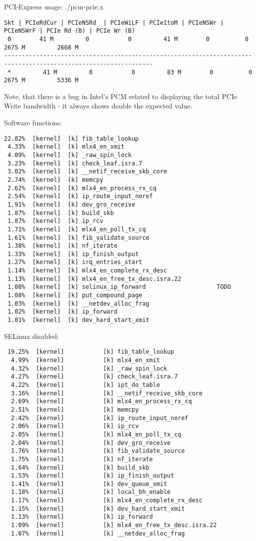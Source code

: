 PCI-Express usage: ./pcm-pcie.x
\begin{lstlisting}
Skt | PCIeRdCur | PCIeNSRd  | PCIeWiLF | PCIeItoM | PCIeNSWr | PCIeNSWrF | PCIe Rd (B) | PCIe Wr (B)
 0        41 M         0           0         41 M        0          0          2675 M         2668 M
----------------------------------------------------------------------------------------------------------------
 *         41 M         0           0         83 M        0          0          2675 M         5336 M
\end{lstlisting}
Note, that there is a bug in Intel's PCM related to displaying
the total PCIe Write bandwidth - it always shows double the expected value.


Software functions:
\begin{lstlisting}
22.02%  [kernel]  [k] fib_table_lookup
 4.33%  [kernel]  [k] mlx4_en_xmit
 4.09%  [kernel]  [k] _raw_spin_lock
 3.23%  [kernel]  [k] check_leaf.isra.7
 3.02%  [kernel]  [k] __netif_receive_skb_core
 2.74%  [kernel]  [k] memcpy
 2.62%  [kernel]  [k] mlx4_en_process_rx_cq
 2.54%  [kernel]  [k] ip_route_input_noref
 1.91%  [kernel]  [k] dev_gro_receive
 1.87%  [kernel]  [k] build_skb
 1.87%  [kernel]  [k] ip_rcv
 1.71%  [kernel]  [k] mlx4_en_poll_tx_cq
 1.61%  [kernel]  [k] fib_validate_source
 1.38%  [kernel]  [k] nf_iterate
 1.33%  [kernel]  [k] ip_finish_output
 1.27%  [kernel]  [k] irq_entries_start
 1.14%  [kernel]  [k] mlx4_en_complete_rx_desc
 1.13%  [kernel]  [k] mlx4_en_free_tx_desc.isra.22
 1.08%  [kernel]  [k] selinux_ip_forward                    TODO
 1.08%  [kernel]  [k] put_compound_page
 1.03%  [kernel]  [k] __netdev_alloc_frag
 1.02%  [kernel]  [k] ip_forward
 1.01%  [kernel]  [k] dev_hard_start_xmit
\end{lstlisting}



SELinux disabled:
\begin{lstlisting}
 19.25%  [kernel]           [k] fib_table_lookup
  4.99%  [kernel]           [k] mlx4_en_xmit
  4.32%  [kernel]           [k] _raw_spin_lock
  4.27%  [kernel]           [k] check_leaf.isra.7
  4.22%  [kernel]           [k] ipt_do_table
  3.16%  [kernel]           [k] __netif_receive_skb_core
  2.69%  [kernel]           [k] mlx4_en_process_rx_cq
  2.51%  [kernel]           [k] memcpy
  2.42%  [kernel]           [k] ip_route_input_noref
  2.06%  [kernel]           [k] ip_rcv
  2.05%  [kernel]           [k] mlx4_en_poll_tx_cq
  2.04%  [kernel]           [k] dev_gro_receive
  1.76%  [kernel]           [k] fib_validate_source
  1.75%  [kernel]           [k] nf_iterate
  1.64%  [kernel]           [k] build_skb
  1.53%  [kernel]           [k] ip_finish_output
  1.41%  [kernel]           [k] dev_queue_xmit
  1.18%  [kernel]           [k] local_bh_enable
  1.17%  [kernel]           [k] mlx4_en_complete_rx_desc
  1.15%  [kernel]           [k] dev_hard_start_xmit
  1.13%  [kernel]           [k] ip_forward
  1.09%  [kernel]           [k] mlx4_en_free_tx_desc.isra.22
  1.07%  [kernel]           [k] __netdev_alloc_frag
\end{lstlisting}

